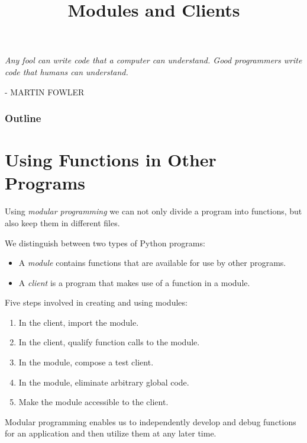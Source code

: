 \documentclass[8pt,a4paper,compress,handout]{beamer}
\title{Modules and Clients}
\date{}
\begin{document}
\begin{frame}
\hfill
\begin{minipage}{150pt}
\begin{flushright}
\tiny \emph{Any fool can write code that a computer can understand. Good programmers write code that humans can understand.} 

\smallskip

- MARTIN FOWLER
\end{flushright}
\end{minipage}
\vfill
\titlepage
\end{frame}

\begin{frame}
\frametitle{Outline}
\tableofcontents
\end{frame}

\section{Using Functions in Other Programs}
\begin{frame}[fragile]
Using \emph{modular programming} we can not only divide a program into functions, but also keep them in different files.

\bigskip

We distinguish between two types of Python programs:
\begin{itemize}
\item A \emph{module} contains functions that are available for use by other programs.

\item A \emph{client} is a program that makes use of a function in a module.
\end{itemize}

\bigskip

Five steps involved in creating and using modules:
\begin{enumerate}
\item In the client, import the module.

\item In the client, qualify function calls to the module.

\item In the module, compose a test client.

\item In the module, eliminate arbitrary global code.

\item Make the module accessible to the client.
\end{enumerate}

\bigskip

Modular programming enables us to independently develop and debug functions for an application and then utilize them at any later time.

\end{frame}
\end{document}
